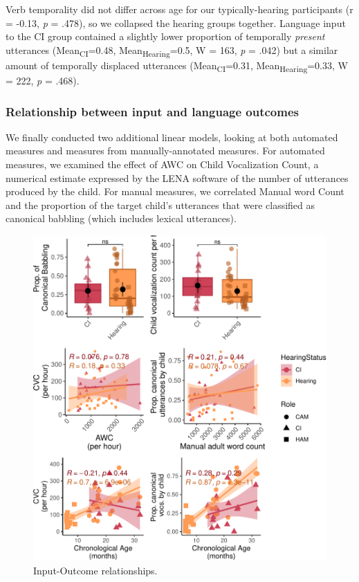 \documentclass[
  man,floatsintext]{apa6}
\begin{document}
Verb temporality did not differ across age for our typically-hearing participants (r = -0.13, \emph{p} = .478), so we collapsed the hearing groups together. Language input to the CI group contained a slightly lower proportion of temporally \emph{present} utterances (Mean\textsubscript{CI}=0.48, Mean\textsubscript{Hearing}=0.5, W = 163, \emph{p} = .042) but a similar amount of temporally displaced utterances (Mean\textsubscript{CI}=0.31, Mean\textsubscript{Hearing}=0.33, W = 222, \emph{p} = .468).

\subsubsection{Relationship between input and language outcomes}\label{relationship-between-input-and-language-outcomes}

We finally conducted two additional linear models, looking at both automated measures and measures from manually-annotated measures. For automated measures, we examined the effect of AWC on Child Vocalization Count, a numerical estimate expressed by the LENA software of the number of utterances produced by the child. For manual measures, we correlated Manual word Count and the proportion of the target child's utterances that were classified as canonical babbling (which includes lexical utterances).

\begin{figure}[h]
\includegraphics[height=1\textheight]{DHH_Input_files/figure-latex/chi-voc-plots-1} \caption{Input-Outcome relationships.}\label{fig:chi-voc-plots}
\end{figure}
\end{document}
